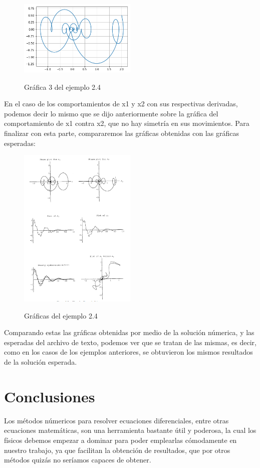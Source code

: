 \documentclass{article}
\begin{document}
\begin{figure}[H]
    \caption{Gráfica 3 del ejemplo 2.4}
    \includegraphics[width=0.5\textwidth]{Grafica13.png}
    \centering
    \label{Cod}
\end{figure}
En el caso de los comportamientos de x1 y x2 con sus respectivas derivadas, podemos decir lo mismo que se dijo anteriormente sobre la gráfica del comportamiento de x1 contra x2, que no hay simetría en sus movimientos.
Para finalizar con esta parte, compararemos las gráficas obtenidas con las gráficas esperadas: 
\begin{figure}[H]
    \caption{Gráficas del ejemplo 2.4}
    \includegraphics[width=0.5\textwidth]{Ejemplo4.PNG}
    \centering
    \label{Cod}
\end{figure}
Comparando estas las gráficas obtenidas por medio de la solución númerica, y las esperadas del archivo de texto, podemos ver que se tratan de las mismas, es decir, como en los casos de los ejemplos anteriores, se obtuvieron los mismos resultados de la solución esperada.

\section{Conclusiones}
Los métodos númericos para resolver ecuaciones diferenciales, entre otras ecuaciones matemáticas, son una herramienta bastante útil y poderosa, la cual los físicos debemos empezar a dominar para poder emplearlas cómodamente en nuestro trabajo, ya que facilitan la obtención de resultados, que por otros métodos quizás no seríamos capaces de obtener.
\end{document}
